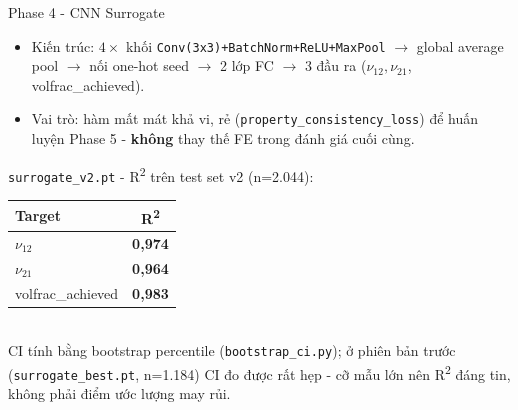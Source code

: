 \documentclass[aspectratio=169,11pt]{beamer}
\begin{document}
\begin{frame}{Phase 4 - CNN Surrogate}
  \begin{itemize}
    \item Kiến trúc: $4\times$ khối \texttt{Conv(3x3)+BatchNorm+ReLU+MaxPool} $\to$ global average pool $\to$ nối one-hot seed $\to$ 2 lớp FC $\to$ 3 đầu ra ($\nu_{12}, \nu_{21}$, volfrac\_achieved).
    \item Vai trò: hàm mất mát khả vi, rẻ (\texttt{property\_consistency\_loss}) để huấn luyện Phase 5 - \textbf{không} thay thế FE trong đánh giá cuối cùng.
  \end{itemize}
  \vspace{2mm}
  \centering
  \texttt{surrogate\_v2.pt} - R\textsuperscript{2} trên test set v2 (n=2.044):
  \begin{tabular}{@{}lc@{}}
    \toprule
    Target & R\textsuperscript{2} \\ \midrule
    $\nu_{12}$ & \textbf{0,974} \\
    $\nu_{21}$ & \textbf{0,964} \\
    volfrac\_achieved & \textbf{0,983} \\
    \bottomrule
  \end{tabular}
  \vspace{2mm}\\
  \small CI tính bằng bootstrap percentile (\texttt{bootstrap\_ci.py}); ở phiên bản trước (\texttt{surrogate\_best.pt}, n=1.184) CI đo được rất hẹp - cỡ mẫu lớn nên R\textsuperscript{2} đáng tin, không phải điểm ước lượng may rủi.
\end{frame}
\end{document}
